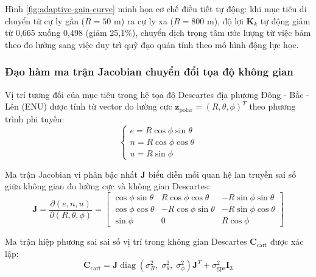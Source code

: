 Hình \ref{fig:adaptive-gain-curve} minh họa cơ chế điều tiết tự động: khi mục tiêu di chuyển từ cự ly gần ($R = 50$ m) ra cự ly xa ($R = 800$ m), độ lợi $\mathbf{K}_k$ tự động giảm từ 0,665 xuống 0,498 (giảm 25,1\%), chuyển dịch trọng tâm ước lượng từ việc bám theo đo lường sang việc duy trì quỹ đạo quán tính theo mô hình động lực học.

\subsubsection{Đạo hàm ma trận Jacobian chuyển đổi tọa độ không gian}

\hspace{0.5cm} Vị trí tương đối của mục tiêu trong hệ tọa độ Descartes địa phương Đông - Bắc - Lên (ENU) được tính từ vector đo lường cực $\mathbf{z}_{\text{polar}} = (R, \theta, \phi)^T$ theo phương trình phi tuyến:
\begin{equation}
\begin{cases}
e = R \cos\phi \sin\theta \\
n = R \cos\phi \cos\theta \\
u = R \sin\phi
\end{cases}
\label{eq:polar-to-cartesian-full}
\end{equation}

Ma trận Jacobian vi phân bậc nhất $\mathbf{J}$ biểu diễn mối quan hệ lan truyền sai số giữa không gian đo lường cực và không gian Descartes:
\begin{equation}
\mathbf{J} = \frac{\partial (e, n, u)}{\partial (R, \theta, \phi)} = \begin{bmatrix}
\cos\phi \sin\theta & R \cos\phi \cos\theta & -R \sin\phi \sin\theta \\
\cos\phi \cos\theta & -R \cos\phi \sin\theta & -R \sin\phi \cos\theta \\
\sin\phi & 0 & R \cos\phi
\end{bmatrix}
\label{eq:jacobian-matrix}
\end{equation}

Ma trận hiệp phương sai sai số vị trí trong không gian Descartes $\mathbf{C}_{\text{cart}}$ được xác lập:
\begin{equation}
\mathbf{C}_{\text{cart}} = \mathbf{J} \operatorname{diag}\left(\sigma_R^2, \; \sigma_{\theta}^2, \; \sigma_{\phi}^2\right) \mathbf{J}^T + \sigma_{\text{gps}}^2 \mathbf{I}_3
\label{eq:cartesian-covariance}
\end{equation}

